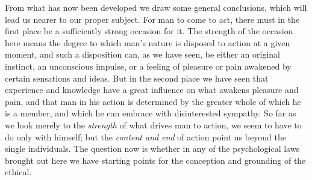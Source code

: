 \documentclass[12pt,a4paper,openany]{book}
\begin{document}
From what has now been developed we draw some general conclusions, which
will lead us nearer to our proper subject. For man to come to act, there
must in the first place be a sufficiently strong occasion for it. The
strength of the occasion here means the degree to which man's nature is
disposed to action at a given moment, and such a disposition can, as we
have seen, be either an original instinct, an unconscious impulse, or a
feeling of pleasure or pain awakened by certain sensations and ideas. But
in the second place we have seen that experience and knowledge have a great
influence on what awakens pleasure and pain, and that man in his action is
determined by the greater whole of which he is a member, and which he can
embrace with disinterested sympathy. So far as we look merely to the
\emph{strength} of what drives man to action, we seem to have to do only
with himself; but the \emph{content and end} of action point us beyond the
single individuals. The question now is whether in any of the psychological
laws brought out here we have starting points for the conception and
grounding of the ethical.
\end{document}
